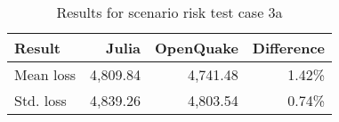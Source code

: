 \begin{table}[htbp]

\centering
\begin{tabular}{ l r r r }

\hline
\rowcolor{anti-flashwhite}
\bf{Result} & \bf{Julia} & \bf{OpenQuake} & \bf{Difference}\\
\hline
Mean loss & 4,809.84 & 4,741.48 & 1.42\% \\
Std. loss & 4,839.26 & 4,803.54 & 0.74\% \\
\hline
\end{tabular}

\caption{Results for scenario risk test case 3a}
\label{tab:result-sr-3a}
\end{table}